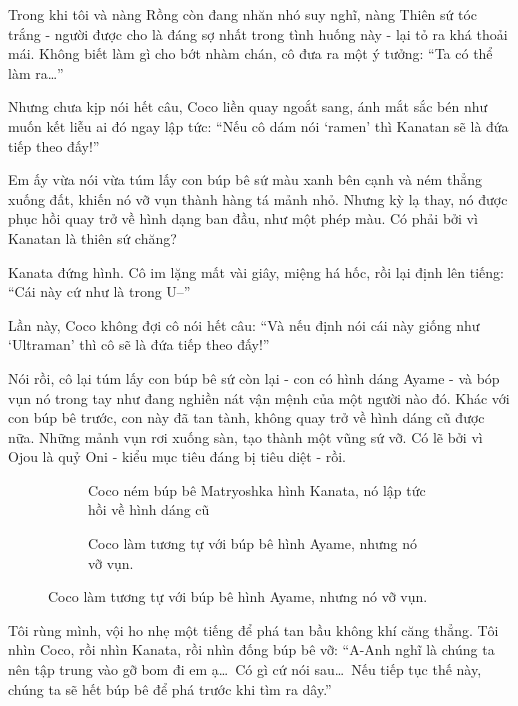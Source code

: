 \documentclass[../main.tex]{subfiles}
\begin{document}
Trong khi tôi và nàng Rồng còn đang nhăn nhó suy nghĩ, nàng Thiên sứ tóc trắng - người được cho là đáng sợ nhất trong tình huống này - lại tỏ ra khá thoải mái. Không biết làm gì cho bớt nhàm chán, cô đưa ra một ý tưởng: ``Ta có thể làm ra\dots''

Nhưng chưa kịp nói hết câu, Coco liền quay ngoắt sang, ánh mắt sắc bén như muốn kết liễu ai đó ngay lập tức: ``Nếu cô dám nói `ramen' thì Kanatan sẽ là đứa tiếp theo đấy!''

Em ấy vừa nói vừa túm lấy con búp bê sứ màu xanh bên cạnh và ném thẳng xuống đất, khiến nó vỡ vụn thành hàng tá mảnh nhỏ. Nhưng kỳ lạ thay, nó được phục hồi quay trở về hình dạng ban đầu, như một phép màu. Có phải bởi vì Kanatan là thiên sứ chăng?

Kanata đứng hình. Cô im lặng mất vài giây, miệng há hốc, rồi lại định lên tiếng: ``Cái này cứ như là trong U--''

Lần này, Coco không đợi cô nói hết câu: ``Và nếu định nói cái này giống như `Ultraman' thì cô sẽ là đứa tiếp theo đấy!''

Nói rồi, cô lại túm lấy con búp bê sứ còn lại - con có hình dáng Ayame - và bóp vụn nó trong tay như đang nghiền nát vận mệnh của một người nào đó. Khác với con búp bê trước, con này đã tan tành, không quay trở về hình dáng cũ được nữa. Những mảnh vụn rơi xuống sàn, tạo thành một vũng sứ vỡ. Có lẽ bởi vì Ojou là quỷ Oni - kiểu mục tiêu đáng bị tiêu diệt - rồi.

\begin{figure}[H]
  \centering
  \begin{subfigure}[t]{0.45\textwidth}
    \centering
    \caption{Coco ném búp bê Matryoshka hình Kanata, nó lập tức hồi về hình dáng cũ}
  \end{subfigure}
  \quad
  \begin{subfigure}[t]{0.45\textwidth}
    \centering
    \caption{Coco làm tương tự với búp bê hình Ayame, nhưng nó vỡ vụn.}
  \end{subfigure}
\end{figure}

Tôi rùng mình, vội ho nhẹ một tiếng để phá tan bầu không khí căng thẳng. Tôi nhìn Coco, rồi nhìn Kanata, rồi nhìn đống búp bê vỡ: ``A-Anh nghĩ là chúng ta nên tập trung vào gỡ bom đi em ạ\dots\ Có gì cứ nói sau\dots\ Nếu tiếp tục thế này, chúng ta sẽ hết búp bê để phá trước khi tìm ra dây.''
\end{document}
